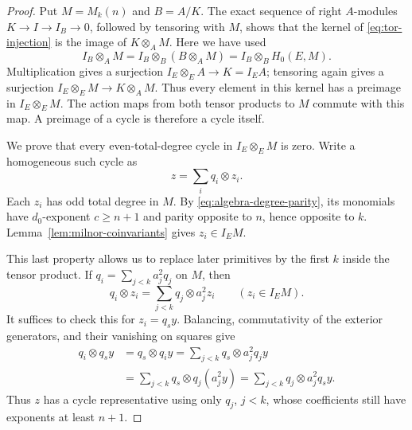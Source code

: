 \begin{proof}
Put $M=M_k(n)$ and $B=A/K$.
The exact sequence of right $A$-modules
$K\to I\to I_B\to0$, followed by tensoring with $M$, shows that the
kernel of \eqref{eq:tor-injection} is the image of $K\otimes_A M$.
Here we have used
\[
 I_B\otimes_A M
 =I_B\otimes_B(B\otimes_A M)
 =I_B\otimes_BH_0(E,M).
\]
Multiplication gives a surjection $I_E\otimes_EA\to K=I_EA$;
tensoring again gives a surjection
$I_E\otimes_EM\to K\otimes_AM$.
Thus every element in this kernel has a preimage in
$I_E\otimes_EM$.  The action maps from both tensor products to $M$
commute with this map.  A preimage of a cycle is therefore a cycle
itself.

We prove that every even-total-degree cycle in $I_E\otimes_EM$ is
zero.  Write a homogeneous such cycle as
\[
 z=\sum_i q_i\otimes z_i.
\]
Each $z_i$ has odd total degree in $M$.  By
\eqref{eq:algebra-degree-parity}, its monomials have $d_0$-exponent
$c\geq n+1$ and parity opposite to $n$, hence opposite to $k$.
Lemma~\ref{lem:milnor-coinvariants} gives $z_i\in I_EM$.

This last property allows us to replace later primitives by the first
$k$ inside the tensor product.  If
$q_i=\sum_{j<k}a_j^2q_j$ on $M$, then
\begin{equation}\label{eq:algebra-hit-balancing}
 q_i\otimes z_i=\sum_{j<k}q_j\otimes a_j^2z_i
 \qquad(z_i\in I_EM).
\end{equation}
It suffices to check this for $z_i=q_sy$.  Balancing, commutativity of
the exterior generators, and their vanishing on squares give
\[
 \begin{aligned}
 q_i\otimes q_sy
 &=q_s\otimes q_iy
 =\sum_{j<k}q_s\otimes a_j^2q_jy\\
 &=\sum_{j<k}q_s\otimes q_j(a_j^2y)
 =\sum_{j<k}q_j\otimes a_j^2q_sy.
 \end{aligned}
\]
Thus $z$ has a cycle representative using only $q_j$, $j<k$, whose
coefficients still have exponents at least $n+1$.


\end{proof}
